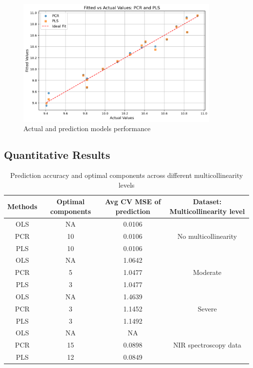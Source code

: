 \documentclass[11pt,twoside,a4paper]{article}
\begin{document}
\begin{figure}[H]
    \centering
    \includegraphics[width=0.9\textwidth]{NIR_fifth_plot.png}
    \caption{Actual and prediction models performance}
    \label{fig:NIR_analysis}
\end{figure}

\newpage
\subsection{Quantitative Results}

\begin{table}[h]
    \centering
    \begin{tabular}{|c|c|c|c|}
        \hline
        Methods & Optimal components & Avg CV MSE of prediction & Dataset: Multicollinearity level \\
        \hline
        OLS & NA & 0.0106 & \multirow{3}{*}{No multicollinearity} \\
        PCR & 10 & 0.0106 &  \\
        PLS & 10 & 0.0106 &  \\
        \hline
        OLS & NA & 1.0642 & \multirow{3}{*}{Moderate} \\        
        PCR & 5 & 1.0477 &  \\
        PLS & 3 & 1.0477 &  \\
        \hline
        OLS & NA & 1.4639 & \multirow{3}{*}{Severe} \\
        PCR & 3 & 1.1452 &  \\
        PLS & 3 & 1.1492 &  \\ 
        \hline  
        OLS & NA & NA & \multirow{3}{*}{NIR spectroscopy data} \\
        PCR & 15 & 0.0898 &  \\
        PLS & 12 & 0.0849 &  \\ 
        \hline
    \end{tabular}
    \caption{Prediction accuracy and optimal components across different multicollinearity levels}
    \label{tab:multicollinearity_comparison}
\end{table}
\end{document}
